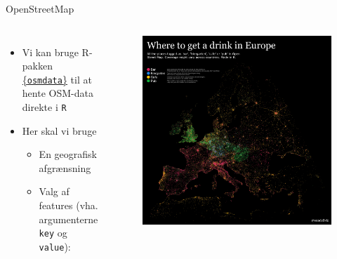 \documentclass[
  8pt,
  ignorenonframetext,
  aspectratio=169]{beamer}
\providecommand{\tightlist}{%
  \setlength{\itemsep}{0pt}\setlength{\parskip}{0pt}}
\newcommand{\columnsbegin}{\begin{columns}}
\newcommand{\columnsend}{\end{columns}}
\begin{document}
\begin{frame}[fragile]{OpenStreetMap}
\protect\hypertarget{openstreetmap-1}{}
\columnsbegin


\begin{itemize}
\item
  Vi kan bruge R-pakken
  \href{https://cran.r-project.org/web/packages/osmdata/vignettes/osmdata.html}{\{\texttt{osmdata}\}}
  til at hente OSM-data direkte i \texttt{R}
\item
  Her skal vi bruge

  \begin{itemize}
  \tightlist
  \item
    En geografisk afgrænsning
  \item
    Valg af features (vha. argumenterne \texttt{key} og \texttt{value}):
  \end{itemize}
\end{itemize}


\begin{figure}[H]
    \centering
    \includegraphics[width=.90\textwidth]{pictures/sundell_bars.png}
\end{figure}

\columnsend
\end{frame}
\end{document}
